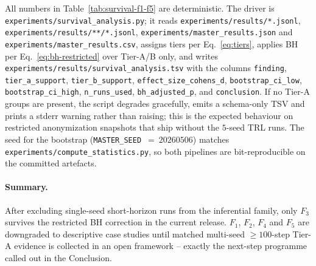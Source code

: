 All numbers in Table~\ref{tab:survival-f1-f5} are deterministic.
The driver is
\texttt{experiments/survival\_analysis.py}; it reads
\texttt{experiments/results/*.jsonl},
\texttt{experiments/results/**/*.jsonl},
\texttt{experiments/master\_results.json} and
\texttt{experiments/master\_results.csv}, assigns tiers per
Eq.~\eqref{eq:tiers}, applies BH per Eq.~\eqref{eq:bh-restricted}
over Tier-A/B only, and writes
\texttt{experiments/results/survival\_analysis.tsv} with the
columns \texttt{finding}, \texttt{tier\_a\_support},
\texttt{tier\_b\_support}, \texttt{effect\_size\_cohens\_d},
\texttt{bootstrap\_ci\_low}, \texttt{bootstrap\_ci\_high},
\texttt{n\_runs\_used}, \texttt{bh\_adjusted\_p}, and
\texttt{conclusion}. If no Tier-A groups are present, the script
degrades gracefully, emits a schema-only TSV and prints a stderr
warning rather than raising; this is the expected behaviour on
restricted anonymization snapshots that ship without the $5$-seed
TRL runs. The seed for the bootstrap
(\texttt{MASTER\_SEED}~$=~20260506$) matches
\texttt{experiments/compute\_statistics.py}, so both pipelines are
bit-reproducible on the committed artefacts.

\paragraph{Summary.}
After excluding single-seed short-horizon runs from the inferential
family, only $F_3$ survives the restricted BH correction in the
current release. $F_1$, $F_2$, $F_4$ and $F_5$ are downgraded to
descriptive case studies until matched multi-seed $\ge 100$-step
Tier-A evidence is collected in an open framework -- exactly the
next-step programme called out in the Conclusion.
